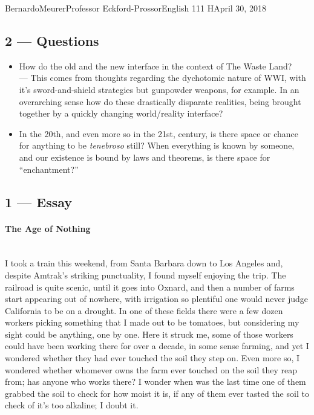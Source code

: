 \documentclass[12pt,letterpaper]{article}
\begin{document}
\begin{mla}{Bernardo}{Meurer}{Professor Eckford-Prossor}{English 111 H}{April 30, 2018}
	\subsection*{2 --- Questions}
	\begin{itemize}
		\item How do the old and the new interface in the context of The Waste Land?\\ --- This comes from thoughts regarding the dychotomic nature of WWI, with it's sword-and-shield strategies but gunpowder weapons, for example. In an overarching sense how do these drastically disparate realities, being brought together by a quickly changing world/reality interface?
		\item In the 20th, and even more so in the 21st, century, is there space or chance for anything to be \textit{tenebroso} still? When everything is known by someone, and our existence is bound by laws and theorems, is there space for ``enchantment?''
	\end{itemize}
	\subsection*{1 --- Essay}
	\paragraph*{The Age of Nothing}  \hspace{0pt} \\
	I took a train this weekend, from Santa Barbara down to Los Angeles and, despite Amtrak's striking punctuality, I found myself enjoying the trip. The railroad is quite scenic, until it goes into Oxnard, and then a number of farms start appearing out of nowhere, with irrigation so plentiful one would never judge California to be on a drought. In one of these fields there were a few dozen workers picking something that I made out to be tomatoes, but considering my sight could be anything, one by one. Here it struck me, some of those workers could have been working there for over a decade, in some sense farming, and yet I wondered whether they had ever touched the soil they step on. Even more so, I wondered whether whomever owns the farm ever touched on the soil they reap from; has anyone who works there? I wonder when was the last time one of them grabbed the soil to check for how moist it is, if any of them ever tasted the soil to check of it's too alkaline; I doubt it.


\end{mla}
\end{document}
